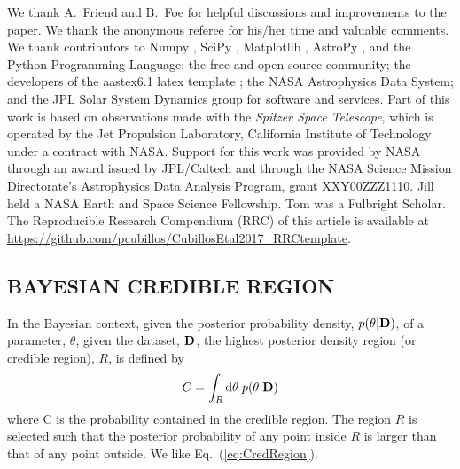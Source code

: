 \acknowledgments

We thank A.\ Friend and B.\ Foe for helpful discussions and
improvements to the paper.  We thank the anonymous referee for his/her
time and valuable comments.  We thank contributors to Numpy
\citep{vanderWaltEtal2011numpy}, SciPy \citep{JonesEtal2001scipy},
Matplotlib \citep{Hunter2007ieeeMatplotlib}, AstroPy
\citep{Astropy2013aaAstroPy}, and the Python Programming Language; the
free and open-source community; the developers of the aastex6.1 latex
template \citep{AASteam2016aastex61}; the NASA Astrophysics Data System;
and the JPL Solar System Dynamics group for software and services.
Part of this work is based on observations made with the {\em Spitzer
  Space Telescope}, which is operated by the Jet Propulsion
Laboratory, California Institute of Technology under a contract with
NASA.  Support for this work was provided by NASA through an award
issued by JPL/Caltech and through the NASA Science Mission
Directorate's Astrophysics Data Analysis Program, grant XXY00ZZZ1110.
Jill held a NASA Earth and Space Science Fellowship.  Tom was a
Fulbright Scholar.  The Reproducible Research Compendium (RRC) of this
article is available at \href{http://tinyurl.com/2fcpre6}
{https://github.com/pcubillos/CubillosEtal2017\_RRCtemplate}.



\begin{appendices}

\section{BAYESIAN CREDIBLE REGION}
\label{sec:CredRegion}

In the Bayesian context, given the posterior probability density,
$p(\theta|{\bf D})$, of a parameter, $\theta$, given the dataset,
${\bf D}$, the highest posterior density region (or credible
region), $R$, is defined by
\begin{equation}
C = \int\sb{R} {\rm d}\theta\;p(\theta|{\bf D})
\label{eq:CredRegion}
\end{equation}
where C is the probability contained in the credible region.  The
region $R$ is selected such that the posterior probability of any
point inside $R$ is larger than that of any point outside.  We like
Eq.\ (\ref{eq:CredRegion}).

\end{appendices}


